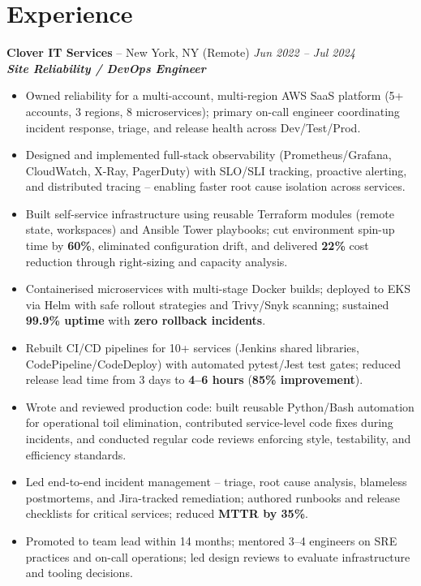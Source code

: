 \documentclass[10pt,a4paper]{article}
\newcommand{\jobentry}[4]{%
  \Needspace{3\baselineskip}%
  \textbf{#1} -- #2 \hfill \textit{#3}\\[-0.15em]
  \textit{#4}\\[-0.25em]
}
\begin{document}
\section*{Experience}
\jobentry{Clover IT Services}{New York, NY (Remote)}{Jun 2022 -- Jul 2024}{\textbf{\textit{Site Reliability / DevOps Engineer}}}
\begin{itemize}
  \item Owned reliability for a multi-account, multi-region AWS SaaS platform (5+ accounts, 3 regions, 8 microservices); primary on-call engineer coordinating incident response, triage, and release health across Dev/Test/Prod.
  \item Designed and implemented full-stack observability (Prometheus/Grafana, CloudWatch, X-Ray, PagerDuty) with SLO/SLI tracking, proactive alerting, and distributed tracing -- enabling faster root cause isolation across services.
  \item Built self-service infrastructure using reusable Terraform modules (remote state, workspaces) and Ansible Tower playbooks; cut environment spin-up time by \textbf{60\%}, eliminated configuration drift, and delivered \textbf{22\%} cost reduction through right-sizing and capacity analysis.
  \item Containerised microservices with multi-stage Docker builds; deployed to EKS via Helm with safe rollout strategies and Trivy/Snyk scanning; sustained \textbf{99.9\% uptime} with \textbf{zero rollback incidents}.
  \item Rebuilt CI/CD pipelines for 10+ services (Jenkins shared libraries, CodePipeline/CodeDeploy) with automated pytest/Jest test gates; reduced release lead time from 3 days to \textbf{4--6 hours} (\textbf{85\% improvement}).
  \item Wrote and reviewed production code: built reusable Python/Bash automation for operational toil elimination, contributed service-level code fixes during incidents, and conducted regular code reviews enforcing style, testability, and efficiency standards.
  \item Led end-to-end incident management -- triage, root cause analysis, blameless postmortems, and Jira-tracked remediation; authored runbooks and release checklists for critical services; reduced \textbf{MTTR by 35\%}.
  \item Promoted to team lead within 14 months; mentored 3--4 engineers on SRE practices and on-call operations; led design reviews to evaluate infrastructure and tooling decisions.
\end{itemize}
\end{document}
